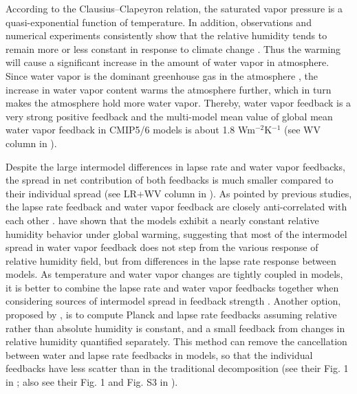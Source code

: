 According to the Clausius--Clapeyron relation, the saturated vapor pressure is a quasi-exponential function of temperature. In addition, observations and numerical experiments consistently show that the relative humidity tends to remain more or less constant in response to climate change \citep{Held2000water,Soden2006,Goosse2010introduction}. Thus the warming will cause a significant increase in the amount of water vapor in atmosphere. Since water vapor is the dominant greenhouse gas in the atmosphere \citep{Held2000water}, the increase in water vapor content warms the atmosphere further, which in turn makes the atmosphere hold more water vapor. Thereby, water vapor feedback   is a very strong positive feedback and the multi-model mean value of global mean water vapor feedback in CMIP5/6 models is about 1.8 Wm$^{-2}$K$^{-1}$ (see WV column in ).

Despite the large intermodel differences in lapse rate and water vapor feedbacks, the spread in net contribution of both feedbacks is much smaller compared to their individual spread (see LR+WV column in ). As pointed by previous studies, the lapse rate feedback and water vapor feedback are closely anti-correlated with each other \citep{Soden2006,PoChedley2018}. \cite{Soden2006} have shown that the models exhibit a nearly constant relative humidity behavior under global warming, suggesting that most of the intermodel spread in water vapor feedback does not step from the various response of relative humidity field, but from differences in the lapse rate response between models. As temperature and water vapor changes are tightly coupled in models, it is better to combine the lapse rate and water vapor feedbacks together when considering sources of intermodel spread in feedback strength \citep{Soden2006,PoChedley2018}. Another option, proposed by \cite{Held_Shell2012}, is to compute Planck and lapse rate feedbacks assuming relative rather than absolute humidity is constant, and a small feedback from changes in relative humidity quantified separately. This method can remove the cancellation between water and lapse rate feedbacks in models, so that the individual feedbacks have less scatter than in the traditional decomposition (see their Fig. 1 in \citealt{Held_Shell2012}; also see their Fig. 1 and Fig. S3 in \citealt{Zelinka2020causes}).

